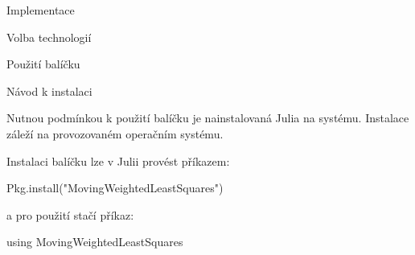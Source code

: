 \chap Implementace

\sec Volba technologií

\sec Použití balíčku

\secc Návod k instalaci

Nutnou podmínkou k použití balíčku je nainstalovaná Julia na systému. Instalace záleží na provozovaném operačním systému.

Instalaci balíčku lze v Julii provést příkazem:

\begtt
Pkg.install("MovingWeightedLeastSquares")
\endtt

a pro použití stačí příkaz:

\begtt
using MovingWeightedLeastSquares
\endtt
